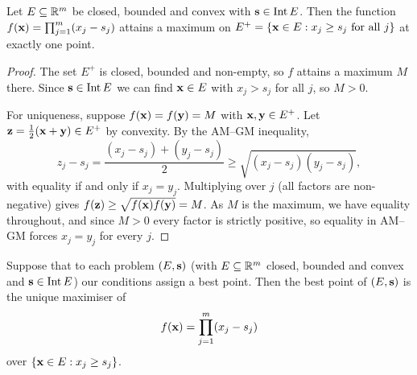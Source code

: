 \documentclass[a4paper]{scrartcl}
\newcommand{\Int}{\operatorname{Int}}
\begin{document}
\begin{lemma}\label{lem:nash-max}
	Let $E \subseteq\mathbb{R}^m$ be closed, bounded and convex with $\vv{s} \in \Int E$. Then the function $f(\mathbf{x}) = \prod_{j=1}^m (x_j - s_j)$ attains a maximum on $E^+ = \{\mathbf{x} \in E : x_j\geq s_j \text{ for all } j\}$ at exactly one point.
\end{lemma}

\begin{proof}
	The set $E^+$ is closed, bounded and non-empty, so $f$ attains a maximum $M$ there. Since $\vv{s} \in \Int E$ we can find $\mathbf{x} \in E$ with $x_j > s_j$ for all $j$, so $M>0$.

	For uniqueness, suppose $f(\mathbf{x}) = f(\mathbf{y}) = M$ with $\mathbf{x},\mathbf{y}\in E^+$. Let $\mathbf{z} = \frac12(\mathbf{x}+\mathbf{y}) \in E^+$ by convexity. By the AM--GM inequality,
	$$z_j - s_j = \frac{(x_j-s_j)+(y_j-s_j)}{2} \geq \sqrt{(x_j-s_j)(y_j-s_j)},$$
	with equality if and only if $x_j = y_j$. Multiplying over $j$ (all factors are non-negative) gives $f(\mathbf{z}) \geq \sqrt{f(\mathbf{x})f(\mathbf{y})} = M$. As $M$ is the maximum, we have equality throughout, and since $M>0$ every factor is strictly positive, so equality in AM--GM forces $x_j = y_j$ for every $j$.
\end{proof}

\begin{theorem}\label{thm:nash-bargain}
	Suppose that to each problem $(E,\mathbf{s})$ (with $E \subseteq \mathbb{R}^m$ closed, bounded and convex and $\vv{s}\in\Int E$) our conditions assign a best point. Then the best point of $(E,\mathbf{s})$ is the unique maximiser of
	$$f(\mathbf{x}) = \prod_{j=1}^m (x_j-s_j)$$
	over $\{\mathbf{x}\in E : x_j \geq s_j\}$.
\end{theorem}
\end{document}
